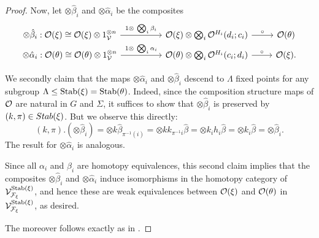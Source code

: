 \documentclass[psamsfonts,oneside,10pt,letterpaper
,draft
]{amsart}%
\renewcommand{\F}{\mathcal F}
\renewcommand{\1}{\ensuremath{\mathbb{id}}}
\begin{document}
\begin{proof}
      Now, let $\otimes \hat \beta_i$ and $\otimes \hat \alpha_i$ be the composites
      \begin{equation}
            \begin{tikzcd}[row sep = tiny]
                  \otimes \hat \beta_i :
                  \O(\ksi)
                  \cong
                  \O(\ksi) \otimes 1_\V^{\otimes n} \arrow[rr, "1 \otimes\ \bigotimes_i \beta_i"]
                  &&
                  \O(\ksi) \otimes \bigotimes_i \O^{H_i}(d_i;c_i) \arrow[r,"\circ"]
                  &
                  \O(\theta)
                  \\
                  \otimes \hat \alpha_i : 
                  \O(\theta)
                  \cong
                  \O(\theta) \otimes 1_\V^{\otimes n} \arrow[rr, "1 \otimes\ \bigotimes_i \alpha_i"]
                  &&
                  \O(\theta) \otimes \bigotimes_i \O^{H_i}(c_i;d_i) \arrow[r,"\circ"]
                  &
                  \O(\ksi).
            \end{tikzcd}
      \end{equation}

      We secondly claim that the maps $\otimes \hat \alpha_i$ and $\otimes \hat \beta_i$ descend to $\Lambda$ fixed points 
      for any subgroup $\Lambda \leq \mathrm{Stab}(\xi) = \mathrm{Stab}(\theta)$.
      Indeed, since the composition structure maps of $\mathcal{O}$ are natural in $G$ and $\Sigma$,
      it suffices to show that $\otimes \hat \beta_i$ is preserved by $(k,\pi)\in Stab(\xi)$.
      But we observe this directly:
      \begin{equation}
            (k, \pi) . (\otimes \hat \beta_i)
            =
            \otimes k \hat\beta_{\pi^{-1}(i)}
            =
            \otimes k k_{\pi^{-1}i} \hat \beta
            =
            \otimes k_i h_i \hat \beta
            =
            \otimes k_i \hat \beta
            =
            \otimes \hat \beta_i.
      \end{equation}
      The result for $\otimes \hat \alpha_i$ is analogous.
      
      Since all $\alpha_i$ and $\beta_i$ are homotopy equivalences,
      this second claim implies that the composites $\otimes \hat \beta_i$ and $\otimes \hat \alpha_i$
      induce isomorphisms in the homotopy category of $\V^{\Stab(\ksi)}_{\F_\ksi}$,
      and hence these are weak equivalences between $\mathcal{O}(\xi)$ and $\mathcal{O}(\theta)$ in $\V^{\Stab(\ksi)}_{\F_\ksi}$,
      as desired.

      The moreover follows exactly as in \cite{Cav14}.
\end{proof}
\end{document}
